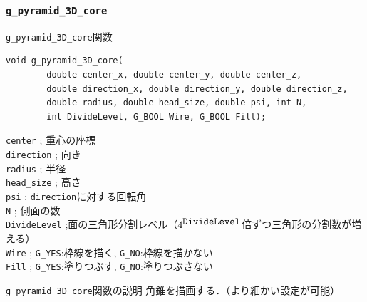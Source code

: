 \documentclass[platex,a4paper,12pt]{jsarticle}%
\begin{document}


\clearpage
\subsubsection{\texttt{g\_pyramid\_3D\_core}}

\begin{itembox}[l]{\texttt{g\_pyramid\_3D\_core}関数}
\begin{verbatim}
void g_pyramid_3D_core(
        double center_x, double center_y, double center_z,
        double direction_x, double direction_y, double direction_z,
        double radius, double head_size, double psi, int N,
        int DivideLevel, G_BOOL Wire, G_BOOL Fill);
\end{verbatim}
\verb|center| ; 重心の座標\\
\verb|direction| ; 向き\\
\verb|radius| ; 半径\\
\verb|head_size| ; 高さ\\
\verb|psi| ; \verb|direction|に対する回転角\\
\verb|N| ; 側面の数\\
\verb|DivideLevel| ;面の三角形分割レベル（$4^{\verb|DivideLevel|}$倍ずつ三角形の分割数が増える）\\
\verb|Wire| ; \verb|G_YES|:枠線を描く, \verb|G_NO|:枠線を描かない \\
\verb|Fill| ; \verb|G_YES|:塗りつぶす, \verb|G_NO|:塗りつぶさない 
\end{itembox}

\begin{itembox}[l]{\texttt{g\_pyramid\_3D\_core}関数の説明}
角錐を描画する．（より細かい設定が可能）
\end{itembox}
\end{document}
